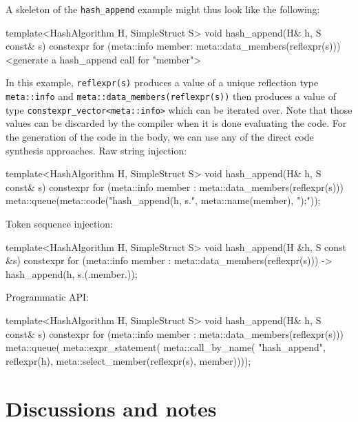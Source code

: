 \documentclass{wg21}
\newcommand{\cc}[1]{\texttt{#1}}
\begin{document}
A skeleton of the \cc{hash_append} example might thus look like the following:

\begin{cpp}
template<HashAlgorithm H, SimpleStruct S>
void hash_append(H& h, S const& s) {
  constexpr {
    for (meta::info member: meta::data_members(reflexpr(s))) {
      <generate a hash_append call for "member">
    }
  }
}
\end{cpp}

In this example, \cc{reflexpr(s)} produces a value of a unique reflection type
\cc{meta::info} and \cc{meta::data_members(reflexpr(s))} then produces a value
of type \cc{constexpr_vector<meta::info>} which can be iterated over. Note that
those values can be discarded by the compiler when it is done evaluating the
code. For the generation of the code in the body, we can use any of the direct
code synthesis approaches. Raw string injection:

\begin{cpp}
template<HashAlgorithm H, SimpleStruct S>
void hash_append(H& h, S const& s) {
  constexpr {
    for (meta::info member : meta::data_members(reflexpr(s))) {
      meta::queue(meta::code("hash_append(h, s.", meta::name(member), ");"));
    }
  }
}
\end{cpp}

Token sequence injection:

\begin{cpp}
template<HashAlgorithm H, SimpleStruct S>
void hash_append(H &h, S const &s) {
  constexpr {
    for (meta::info member : meta::data_members(reflexpr(s))) {
      -> { hash_append(h, s.(.member.)); }
    }
  }
}
\end{cpp}

Programmatic API:

\begin{cpp}
template<HashAlgorithm H, SimpleStruct S>
void hash_append(H& h, S const& s) {
  constexpr {
    for (meta::info member : meta::data_members(reflexpr(s))) {
      meta::queue(
        meta::expr_statement(
          meta::call_by_name(
            "hash_append",
            reflexpr(h),
            meta::select_member(reflexpr(s), member))));
    }
  }
}
\end{cpp}


\section{Discussions and notes}
\end{document}
